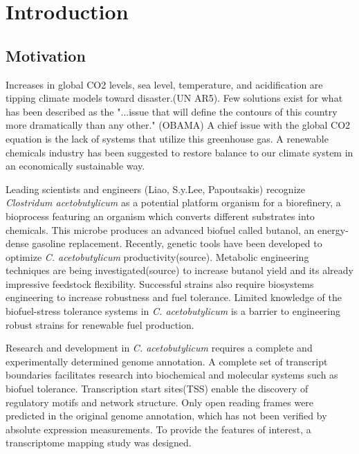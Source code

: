 %
%
\chapter{Introduction}


\section{Motivation}
Increases in global CO2 levels, sea level, temperature, and acidification are tipping climate models toward disaster.(UN AR5). Few solutions exist for what has been described as the "...issue that will define the contours of this country more dramatically than any other." (OBAMA) A chief issue with the global CO2 equation is the lack of systems that utilize this greenhouse gas. A renewable chemicals industry has been suggested to restore balance to our climate system in an economically sustainable way.

Leading scientists and engineers (Liao, S.y.Lee, Papoutsakis) recognize \textit{Clostridum acetobutylicum} as a potential platform organism for a biorefinery, a bioprocess featuring an organism which converts different substrates into chemicals. This microbe produces an advanced biofuel called butanol, an energy-dense gasoline replacement. Recently, genetic tools have been developed to optimize \textit{C. acetobutylicum} productivity(source). Metabolic engineering techniques are being investigated(source) to increase butanol yield and its already impressive feedstock flexibility. Successful strains also require biosystems engineering to increase robustness and fuel tolerance. Limited knowledge of the biofuel-stress tolerance systems in \textit{C. acetobutylicum} is a barrier to engineering robust strains for renewable fuel production.

Research and development in \textit{C. acetobutylicum} requires a complete and experimentally determined genome annotation. A complete set of transcript boundaries facilitates research into biochemical and molecular systems such as biofuel tolerance. Transcription start sites(TSS) enable the discovery of regulatory motifs and network structure. Only open reading frames were predicted in the original genome annotation, which has not been verified by absolute expression measurements. To provide the features of interest, a transcriptome mapping study was designed.

